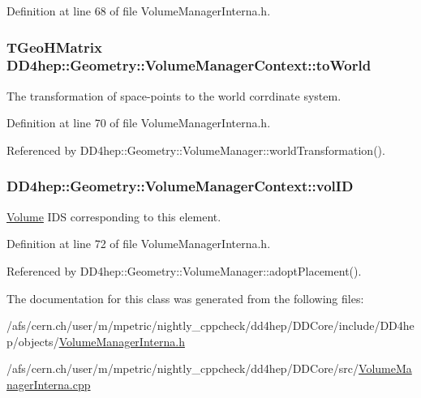 Definition at line 68 of file VolumeManagerInterna.h.\hypertarget{class_d_d4hep_1_1_geometry_1_1_volume_manager_context_a724f7f6ffc6fc9e91dca0f07d5f14d1d}{
\subsubsection[{toWorld}]{\setlength{\rightskip}{0pt plus 5cm}TGeoHMatrix {\bf DD4hep::Geometry::VolumeManagerContext::toWorld}}}
\label{class_d_d4hep_1_1_geometry_1_1_volume_manager_context_a724f7f6ffc6fc9e91dca0f07d5f14d1d}


The transformation of space-\/points to the world corrdinate system. 

Definition at line 70 of file VolumeManagerInterna.h.

Referenced by DD4hep::Geometry::VolumeManager::worldTransformation().\hypertarget{class_d_d4hep_1_1_geometry_1_1_volume_manager_context_a3982d4e94fc483caa54382e719eb568c}{
\subsubsection[{volID}]{ {\bf DD4hep::Geometry::VolumeManagerContext::volID}}}
\label{class_d_d4hep_1_1_geometry_1_1_volume_manager_context_a3982d4e94fc483caa54382e719eb568c}


\hyperlink{class_d_d4hep_1_1_geometry_1_1_volume}{Volume} IDS corresponding to this element. 

Definition at line 72 of file VolumeManagerInterna.h.

Referenced by DD4hep::Geometry::VolumeManager::adoptPlacement().

The documentation for this class was generated from the following files:\begin{DoxyCompactItemize}
\item 
/afs/cern.ch/user/m/mpetric/nightly\_\-cppcheck/dd4hep/DDCore/include/DD4hep/objects/\hyperlink{_volume_manager_interna_8h}{VolumeManagerInterna.h}\item 
/afs/cern.ch/user/m/mpetric/nightly\_\-cppcheck/dd4hep/DDCore/src/\hyperlink{_volume_manager_interna_8cpp}{VolumeManagerInterna.cpp}\end{DoxyCompactItemize}
